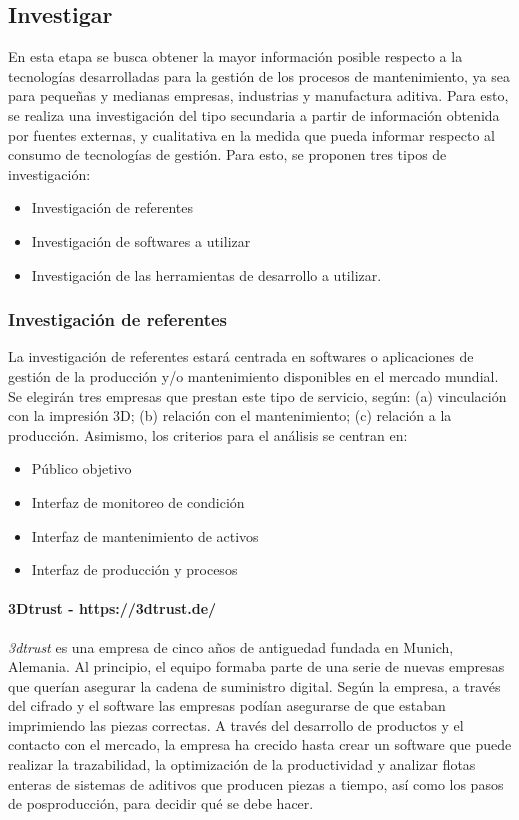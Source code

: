 \subsection{Investigar}

En esta etapa se busca obtener la mayor información posible respecto a la tecnologías desarrolladas para la gestión de los procesos de mantenimiento, ya sea para pequeñas y medianas empresas, industrias y manufactura aditiva. Para esto, se realiza una investigación del tipo secundaria a partir de información obtenida por fuentes externas, y cualitativa en la medida que pueda informar respecto al consumo de tecnologías de gestión. Para esto, se proponen tres tipos de investigación:

\begin{itemize}

\item Investigación de referentes 
\item Investigación de softwares a utilizar
\item Investigación de las herramientas de desarrollo a utilizar.
\end{itemize}

\subsubsection{Investigación de referentes}

La investigación de referentes estará centrada en softwares o aplicaciones de gestión de la producción y/o mantenimiento disponibles en el mercado mundial. Se elegirán tres empresas que prestan este tipo de servicio, según: (a) vinculación con la impresión 3D; (b) relación con el mantenimiento; (c) relación a la producción. Asimismo, los criterios para el análisis se centran en:
\begin{itemize}
\item Público objetivo
\item Interfaz de monitoreo de condición
\item Interfaz de mantenimiento de activos
\item Interfaz de producción y procesos

\end{itemize}

\paragraph{3Dtrust - https://3dtrust.de/}

\textit{3dtrust} es una empresa de cinco años de antiguedad fundada en Munich, Alemania. Al principio, el equipo formaba parte de una serie de nuevas empresas que querían asegurar la cadena de suministro digital. Según la empresa, a través del cifrado y el software las empresas podían asegurarse de que estaban imprimiendo las piezas correctas. A través del desarrollo de productos y el contacto con el mercado, la empresa ha crecido hasta  crear un software que puede realizar la trazabilidad, la optimización de la productividad y analizar flotas enteras de sistemas de aditivos que producen piezas a tiempo, así como los pasos de posproducción, para decidir qué se debe hacer.

